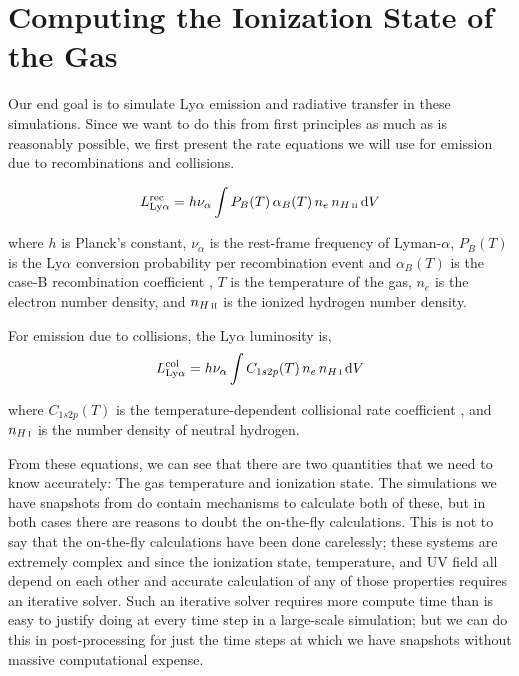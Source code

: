 \section{Computing the Ionization State of the Gas}
\label{sec:lycrt}

Our end goal is to simulate Ly$\alpha$ emission and radiative transfer in these simulations.
Since we want to do this from first principles as much as is reasonably possible, we first present the rate equations we will use for emission due to recombinations and collisions.

\begin{equation}
\label{eq:j_rec}
    L_{\rm Ly \alpha}^{\rm rec} = h\nu_{\alpha} \int P_B(T)\,\alpha_B(T)\,n_e\,n_{{H\,\textsc{ii}}}\,\mathrm{d}V
\end{equation}

\noindent where $h$ is Planck's constant, $\nu_{\alpha}$ is the rest-frame frequency of Lyman-$\alpha$, $P_B(T)$ is the Ly$\alpha$ conversion probability per recombination event and $\alpha_B(T)$ is the case-B recombination coefficient \citep{Cantalupo2005, Dijkstra2014, Hui1997}, $T$ is the temperature of the gas, $n_{e}$ is the electron number density, and $n_{{H\,\textsc{ii}}}$ is the ionized hydrogen number density.

For emission due to collisions, the Ly$\alpha$ luminosity is,
\begin{equation}
\label{eq:j_col}
    L_{\rm Ly \alpha}^{\rm col} = h\nu_{\alpha} \int C_{1s2p}(T)\,n_e\,n_{H\,\textsc{i}}\,\mathrm{d}V
\end{equation}

\noindent where $C_{1s2p}(T)$ is the temperature-dependent collisional rate coefficient \citep{Scholz1991}, and $n_{{H\,\textsc{i}}}$ is the number density of neutral hydrogen.

From these equations, we can see that there are two quantities that we need to know accurately: The gas temperature and ionization state.
The simulations we have snapshots from do contain mechanisms to calculate both of these, but in both cases there are reasons to doubt the on-the-fly calculations.
This is not to say that the on-the-fly calculations have been done carelessly; these systems are extremely complex and since the ionization state, temperature, and UV field all depend on each other and accurate calculation of any of those properties requires an iterative solver.
Such an iterative solver requires more compute time than is easy to justify doing at every time step in a large-scale simulation; but we can do this in post-processing for just the time steps at which we have snapshots without massive computational expense.

